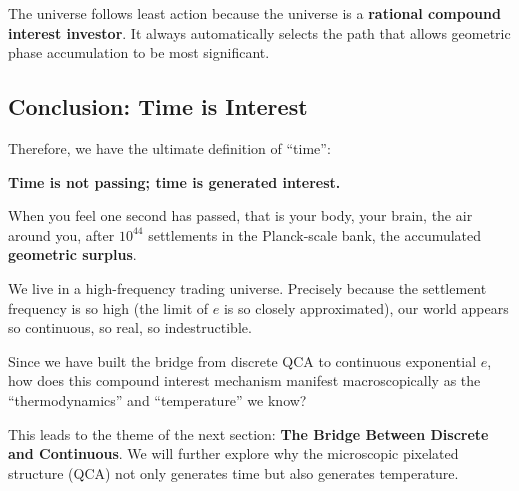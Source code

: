 The universe follows least action because the universe is a \textbf{rational compound interest investor}. It always automatically selects the path that allows geometric phase accumulation to be most significant.

\subsection{Conclusion: Time is Interest}

Therefore, we have the ultimate definition of ``time'':

\textbf{Time is not passing; time is generated interest.}

When you feel one second has passed, that is your body, your brain, the air around you, after $10^{44}$ settlements in the Planck-scale bank, the accumulated \textbf{geometric surplus}.

We live in a high-frequency trading universe. Precisely because the settlement frequency is so high (the limit of $e$ is so closely approximated), our world appears so continuous, so real, so indestructible.

Since we have built the bridge from discrete QCA to continuous exponential $e$, how does this compound interest mechanism manifest macroscopically as the ``thermodynamics'' and ``temperature'' we know?

This leads to the theme of the next section: \textbf{The Bridge Between Discrete and Continuous}. We will further explore why the microscopic pixelated structure (QCA) not only generates time but also generates temperature.

